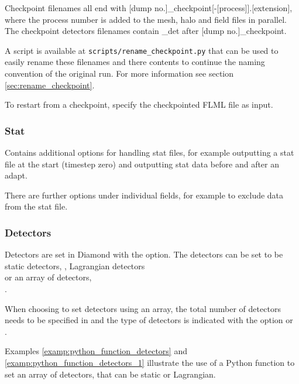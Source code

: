 Checkpoint filenames all end with [dump
no.]\_checkpoint[-[process]].[extension], where the process number is added
to the mesh, halo and field files in parallel.  The checkpoint detectors
filenames contain \_det after [dump no.]\_checkpoint. 

A script is available at \lstinline[language = bash]+scripts/rename_checkpoint.py+ 
that can be used to easily rename these filenames and there contents to continue 
the naming convention of the original run. For more information see section 
\ref{sec:rename_checkpoint}.

To restart from a checkpoint, specify the checkpointed FLML file as input.

\subsubsection{Stat}
Contains additional options for handling stat files, for example outputting
a stat file at the start (timestep zero) and outputting stat data before and
after an adapt.

There are further options under individual fields, for example to exclude data from the stat file.

\subsubsection{Detectors}
\label{detectors_options}

Detectors are set in Diamond with the  option. The detectors can be set to be static detectors, , Lagrangian detectors \\
 or an array of detectors, \\
.

When choosing to set detectors using an array, the total number of detectors
needs to be specified in
 and the type of
detectors is indicated with the option
 or \\
.

Examples \ref{examp:python_function_detectors} and
\ref{examp:python_function_detectors_1} illustrate the use of a Python
function to set an array of detectors, that can be static or Lagrangian.


